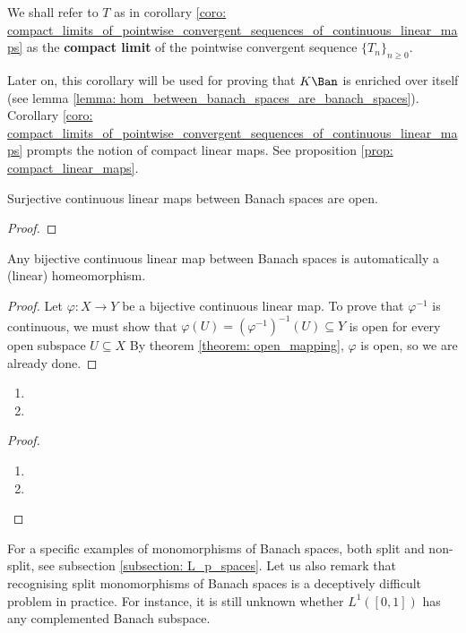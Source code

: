         \begin{definition} \label{def: compact_limits}
            We shall refer to $T$ as in corollary \ref{coro: compact_limits_of_pointwise_convergent_sequences_of_continuous_linear_maps} as the \textbf{compact limit} of the pointwise convergent sequence $\{T_n\}_{n \geq 0}$.
        \end{definition}
        Later on, this corollary will be used for proving that $K\-\Ban$ is enriched over itself (see lemma \ref{lemma: hom_between_banach_spaces_are_banach_spaces}). Corollary \ref{coro: compact_limits_of_pointwise_convergent_sequences_of_continuous_linear_maps} prompts the notion of compact linear maps. See proposition \ref{prop: compact_linear_maps}.

        \begin{theorem} \label{theorem: open_mapping}
            Surjective continuous linear maps between Banach spaces are open.
        \end{theorem}
            \begin{proof}
            \end{proof}
        \begin{corollary} \label{coro: linear_homeomorphisms}
            Any bijective continuous linear map between Banach spaces is automatically a (linear) homeomorphism.
        \end{corollary}
            \begin{proof}
                Let $\varphi: X \to Y$ be a bijective continuous linear map. To prove that $\varphi^{-1}$ is continuous, we must show that $\varphi(U) = (\varphi^{-1})^{-1}(U) \subseteq Y$ is open for every open subspace $U \subseteq X$ By theorem \ref{theorem: open_mapping}, $\varphi$ is open, so we are already done.
            \end{proof}
            
        \begin{lemma} \label{lemma: banach_spaces_extensions}
            \begin{enumerate}
                \item 
                \item 
            \end{enumerate}
        \end{lemma}
            \begin{proof}
                \begin{enumerate}
                    \item 
                    \item 
                \end{enumerate}
            \end{proof}
        For a specific examples of monomorphisms of Banach spaces, both split and non-split, see subsection \ref{subsection: L_p_spaces}. Let us also remark that recognising split monomorphisms of Banach spaces is a deceptively difficult problem in practice. For instance, it is still unknown whether $L^1([0, 1])$ has any complemented Banach subspace. 

